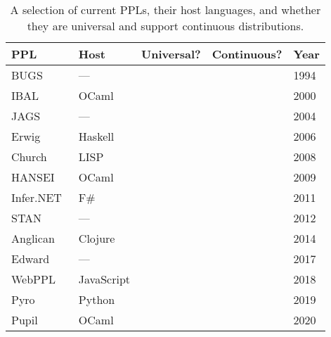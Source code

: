 \documentclass[sigconf]{acmart}
\newcommand{\cmark}{\textcolor{green1}{\checkmark}}%
\newcommand{\xmark}{\textcolor{red1}{\ding{55}}}%
\newcommand{\pupil}{Pupil\xspace}
\begin{document}
\begin{table}
  \centering
  \begin{tabular}{ l l c c l }
    \toprule
    \textbf{PPL}
    & \textbf{Host}
    & \textbf{Universal?}
    & \textbf{Continuous?}
    & \textbf{Year} \\
    \midrule

    BUGS~\cite{gilks1994bugs}
    & --- & \xmark & \cmark & 1994 \\

    IBAL~\cite{ibal}
    & OCaml & \xmark & \xmark & 2000 \\

    JAGS~\cite{plummer2004jags}
    & --- & \xmark & \cmark & 2004 \\

    Erwig~\cite{erwig}
    & Haskell & \cmark & \cmark & 2006\\

    Church~\cite{goodman2012church}
    & LISP & \cmark & \cmark & 2008 \\

    HANSEI~\cite{kiselyov2009embedded}
    & OCaml & \xmark & \xmark & 2009 \\

    Infer.NET~\cite{wang2011using}
    & F\# & \xmark & \cmark & 2011 \\

    STAN~\cite{carpenter2017stan}
    & --- & \xmark & \cmark & 2012 \\

    Anglican~\cite{anglican-smc}
    & Clojure & \cmark & \cmark & 2014 \\

    Edward~\cite{edward}
    & --- & \xmark & \cmark & 2017\\

    WebPPL~\cite{mobus2018structure}
    & JavaScript & \cmark & \cmark & 2018 \\

    Pyro~\cite{bingham2019pyro}
    & Python & \cmark & \cmark & 2019 \\

    \pupil
    & OCaml & \cmark & \cmark & 2020 \\
    \bottomrule
  \end{tabular}
  \caption{A selection of current PPLs, their host languages, and whether they are universal and support continuous distributions.}
  \label{tab:ppl-summ}
\end{table}
\end{document}
